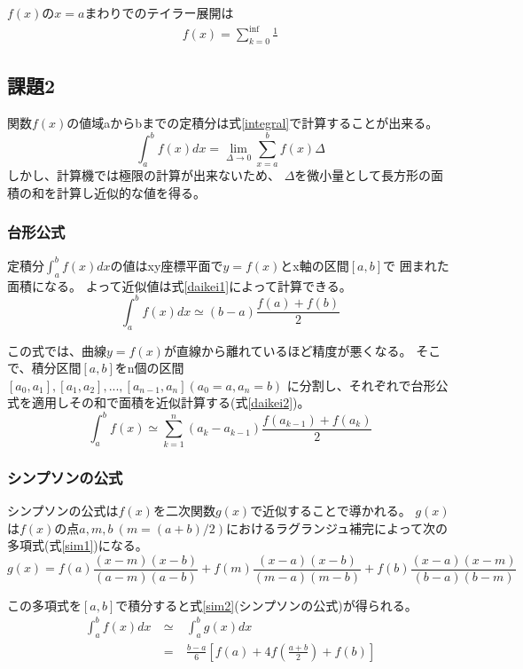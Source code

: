 \documentclass[dvipdfmx]{jsarticle}
\begin{document}
$f(x)$の$x=a$まわりでのテイラー展開は
\begin{eqnarray}
  f(x) = \sum_{k=0}^{\inf} \frac{1}{}
\end{eqnarray}

\subsection{課題2}

関数$f(x)$の値域aからbまでの定積分は式\ref{integral}で計算することが出来る。
\begin{equation}
  \int_a^b f(x) dx = \lim_{\Delta \to 0} \sum_{x=a}^{b} f(x) \Delta
  \label{integral}
\end{equation}
しかし、計算機では極限の計算が出来ないため、
$\Delta$を微小量として長方形の面積の和を計算し近似的な値を得る。

\subsubsection{台形公式}
定積分$\int_a^b f(x)dx$の値はxy座標平面で$y=f(x)$とx軸の区間$[a,b]$で
囲まれた面積になる。
よって近似値は式\ref{daikei1}によって計算できる。
\begin{equation}
  \int_a^b f(x)dx \simeq (b-a)\frac{f(a)+f(b)}{2}
  \label{daikei1}
\end{equation}

この式では、曲線$y=f(x)$が直線から離れているほど精度が悪くなる。
そこで、積分区間$[a,b]$をn個の区間$[a_0,a_1],[a_1,a_2],...,[a_{n-1},a_n] (a_0=a,a_n=b)$
に分割し、それぞれで台形公式を適用しその和で面積を近似計算する(式\ref{daikei2})。
\begin{equation}
  \int_a^b f(x) \simeq \sum_{k=1}^{n} (a_k-a_{k-1})\frac{f(a_{k-1})+f(a_k)}{2}
  \label{daikei2}
\end{equation}

\subsubsection{シンプソンの公式}
シンプソンの公式は$f(x)$を二次関数$g(x)$で近似することで導かれる。
$g(x)$は$f(x)$の点$a,m,b~(m=(a+b)/2)$におけるラグランジュ補完によって次の多項式(式\ref{sim1})になる。
\begin{equation}
  g(x) = f(a)\frac{(x-m)(x-b)}{(a-m)(a-b)}+f(m)\frac{(x-a)(x-b)}{(m-a)(m-b)}+f(b)\frac{(x-a)(x-m)}{(b-a)(b-m)}
  \label{sim1}
\end{equation}

この多項式を$[a,b]$で積分すると式\ref{sim2}(シンプソンの公式)が得られる。
\begin{eqnarray}
  \int_a^b f(x)dx ~&\simeq&~ \int_a^b g(x)dx \nonumber \\
  &=&~ \frac{b-a}{6} \left[f(a)+4f(\frac{a+b}{2})+f(b)\right]
  \label{sim2}
\end{eqnarray}
\end{document}
